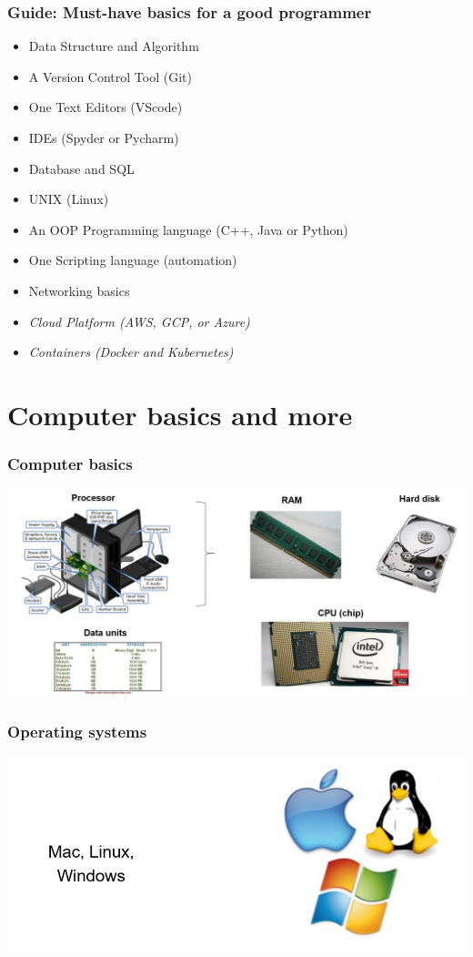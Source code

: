 \documentclass{beamer}
\begin{document}
\begin{frame}
    \frametitle{Guide: Must-have basics for a good programmer}
    \begin{itemize}
        \item Data Structure and Algorithm
        \item A Version Control Tool (Git)
        \item One Text Editors (VScode)
        \item IDEs (Spyder or Pycharm)
        \item Database and SQL
        \item UNIX (Linux)
        \item An OOP Programming language (C++, Java or Python)
        \item One Scripting language (automation)
        \item Networking basics
        \item \textit{Cloud Platform (AWS, GCP, or Azure)}
        \item \textit{Containers (Docker and Kubernetes)}
    \end{itemize}
\end{frame}

\section{Computer basics and more} 

\begin{frame}
    \frametitle{Computer basics}
    \centering
    \includegraphics[scale = 0.35]{figures/computer.jpg}
\end{frame}

\begin{frame}
    \frametitle{Operating systems}
    \centering
    \includegraphics[scale = 0.5]{figures/os.jpg}
\end{frame}
\end{document}
